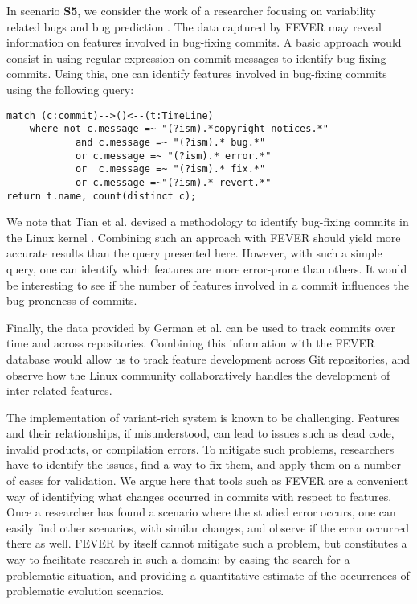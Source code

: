 In scenario \textbf{S5}, we consider the work of a researcher focusing on variability related bugs \citep{abal_42_2014} and bug prediction \citep{giger_comparing_2011}.
The data captured by FEVER may reveal information on features involved in bug-fixing commits.
A basic approach would consist in using regular expression on commit messages to identify bug-fixing commits.
Using this, one can identify features involved in bug-fixing commits using the following query:
\vspace{-.5ex}
\begin{verbatim}
match (c:commit)-->()<--(t:TimeLine)
	where not c.message =~ "(?ism).*copyright notices.*" 
			and c.message =~ "(?ism).* bug.*" 
			or c.message =~ "(?ism).* error.*" 
			or  c.message =~ "(?ism).* fix.*" 
			or c.message =~"(?ism).* revert.*" 
return t.name, count(distinct c);
\end{verbatim}
\vspace{-.5ex}
We note that Tian et al. devised a methodology to identify bug-fixing commits in the Linux kernel \citep{tian_identifying_2012}.
Combining such an approach with FEVER should yield more accurate results than the query presented here.
However, with such a simple query, one can identify which features are more error-prone than others.
It would be interesting to see if the number of features involved in a commit influences
the bug-proneness of commits.

Finally, the data provided by German et al. \citep{german_continuously_2015} can be used to track commits over time and across repositories.
Combining this information with the FEVER database would allow us to track feature development across Git repositories, 
and observe how the Linux community collaboratively handles the development of inter-related features.

The implementation of variant-rich system is known to be challenging. Features and their relationships, if misunderstood, can lead to issues such as dead code,
invalid products, or compilation errors.
To mitigate such problems, researchers have to identify the issues, find a way to fix them, and apply them on a number of cases for validation.
We argue here that tools such as FEVER are a convenient way of identifying what changes occurred in commits with respect to features.
Once a researcher has found a scenario where the studied error occurs, one can easily find other scenarios, with similar changes, and observe if the error occurred there as well.
FEVER by itself cannot mitigate such a problem, but constitutes a way to facilitate research in such a domain: by easing the search for a problematic situation, and providing a  quantitative estimate of the occurrences of problematic evolution scenarios.

